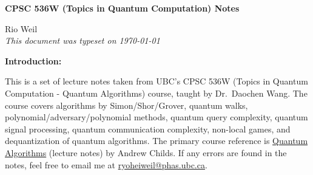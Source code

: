 \documentclass[10pt]{article}
\begin{document}
\begin{tcolorbox}
  \begin{center}
  \begin{Large}
    \textbf{CPSC 536W (Topics in Quantum Computation) Notes} \\
    \vspace{5pt}
  \end{Large}
  \begin{large}
        Rio Weil \\
\vspace{5pt}
    \emph{This document was typeset on \today}
  \end{large}
  \end{center}
\end{tcolorbox}

\begin{center}
  \textbf{Introduction:}

  This is a set of lecture notes taken from UBC's CPSC 536W (Topics in Quantum Computation - Quantum Algorithms) course, taught by Dr.\ Daochen Wang. The course covers algorithms by Simon/Shor/Grover, quantum walks, polynomial/adversary/polynomial methods, quantum query complexity, quantum signal processing, quantum communication complexity, non-local games, and dequantization of quantum algorithms. The primary course reference is \href{https://www.cs.umd.edu/~amchilds/qa/}{Quantum Algorithms} (lecture notes) by Andrew Childs. If any errors are found in the notes, feel free to email me at \href{mailto:ryoheiweil@phas.ubc.ca}{ryoheiweil@phas.ubc.ca}.

\end{center}
\tableofcontents

\newpage
























\end{document}
